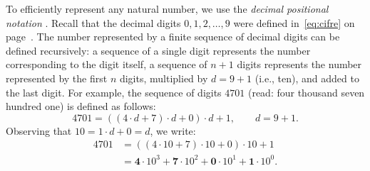 To efficiently represent any natural number, we use the \emph{decimal positional
notation}%
%
.
Recall that the decimal digits $0,1,2,\dots, 9$ were defined in~\eqref{eq:cifre}
on page~\pageref{eq:cifre}.
The number represented by a finite sequence of decimal digits can be 
defined recursively: a sequence of a single digit represents the number 
corresponding to the digit itself, a sequence of $n+1$ digits represents the 
number represented by the first $n$ digits, multiplied by $d=9+1$ (i.e., ten),
and added to the last digit. 
For example, the sequence of digits $4701$ (read: four thousand seven hundred
one)
is defined as follows:
\[ 
  4701 = ((4\cdot d+7)\cdot d+0)\cdot d+1, \qquad d=9+1.
\]
Observing that $10 = 1\cdot d + 0 = d$, we write:
\begin{align*}
  4701 
  & = ((4\cdot 10 + 7)\cdot 10 +0)\cdot 10 + 1 \\
    & = \mathbf 4\cdot 10^3 + \mathbf 7\cdot 10^2 + \mathbf 0\cdot 10^1 +
  \mathbf 1 \cdot 10^0.
\end{align*}

